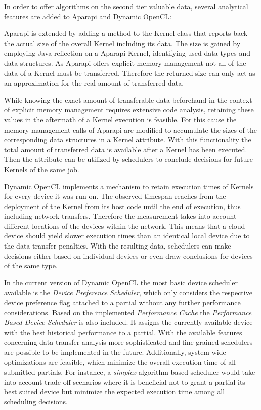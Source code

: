 In order to offer algorithms on the second tier valuable data, several analytical features are added to Aparapi and Dynamic OpenCL:
\begin{description}[style=nextline]
	\item[Kernel Data Size]
	Aparapi is extended by adding a method to the Kernel class that reports back the actual size of the overall Kernel including its data. The size is gained by employing Java reflection on a Aparapi Kernel, identifying used data types and data structures. As Aparapi offers explicit memory management not all of the data of a Kernel must be transferred. Therefore the returned size can only act as an approximation for the real amount of transferred data.
	\item[Historical Data Transfer]
	While knowing the exact amount of transferable data beforehand in the context of explicit memory management requires extensive code analysis, retaining these values in the aftermath of a Kernel execution is feasible. For this cause the memory management calls of Aparapi are modified to accumulate the sizes of the corresponding data structures in a Kernel attribute. With this functionality the total amount of transferred data is available after a Kernel has been executed. Then the attribute can be utilized by schedulers to conclude decisions for future Kernels of the same job.
	\item[Performance Cache]
	Dynamic OpenCL implements a mechanism to retain execution times of Kernels for every device it was run on. The observed timespan reaches from the deployment of the Kernel from its host code until the end of execution, thus including network transfers. Therefore the measurement takes into account different locations of the devices within the network. This means that a cloud device should yield slower execution times than an identical local device due to the data transfer penalties. With the resulting data, schedulers can make decisions either based on individual devices or even draw conclusions for devices of the same type.
\end{description}

In the current version of Dynamic OpenCL the most basic device scheduler available is the \textit{Device Preference Scheduler}, which only considers the respective device preference flag attached to a partial without any further performance considerations.
Based on the implemented \textit{Performance Cache} the \textit{Performance Based Device Scheduler} is also included. It assigns the currently available device with the best historical performance to a partial. With the available features concerning data transfer analysis more sophisticated and fine grained schedulers are possible to be implemented in the future. Additionally, system wide optimizations are feasible, which minimize the overall execution time of all submitted partials. For instance, a \textit{simplex} algorithm based scheduler would take into account trade off scenarios where it is beneficial not to grant a partial its best suited device but minimize the expected execution time among all scheduling decisions.

